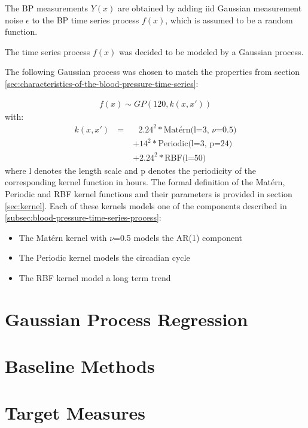 The BP measurements $Y(x)$ are obtained by adding iid Gaussian measurement noise
$\epsilon$ to the BP time series process $f(x)$, which is assumed
to be a random function.

The time series process $f(x)$ was decided to be modeled by a Gaussian process.

The following Gaussian process was chosen to match the properties from
section \ref{sec:characteristics-of-the-blood-pressure-time-series}:

\begin{gather*}
    f(x) \sim GP(120, k(x,x'))
\end{gather*}
with:
\begin{align*}
    k(x, x') \text{ } = &\text{ } 2.24^{2} * \text{Matérn(l=3, $\nu$=0.5)} \\
             &+  14^{2} * \text{Periodic(l=3, p=24)} \\
             &+  2.24^{2} * \text{RBF(l=50)}
\end{align*}
where l denotes the length scale and p denotes the periodicity
of the corresponding kernel function in hours.
The formal definition of the Matérn, Periodic and RBF kernel
functions and their parameters is provided in section \ref{sec:kernel}.
Each of these kernels models one of the components described in
\ref{subsec:blood-pressure-time-series-process}:
\begin{itemize}
    \item The Matérn kernel with $\nu$=0.5 models the AR(1) component
    \item The Periodic kernel models the circadian cycle
    \item The RBF kernel model a long term trend
\end{itemize}






\section{Gaussian Process Regression}\label{sec:gaussian-process-regression}


\section{Baseline Methods}\label{sec:baseline-methods}


\section{Target Measures}\label{sec:target-measures}

